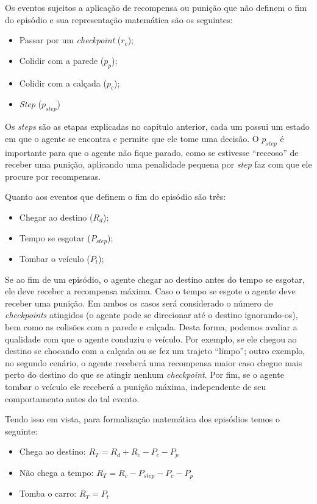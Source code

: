 Os eventos sujeitos a aplicação de recompensa ou punição que não definem o fim do episódio e sua representação matemática são os seguintes:

\begin{itemize}
   \item Passar por um \textit{checkpoint} ($r_c$);
   \item Colidir com a parede ($p_p$);
   \item Colidir com a calçada ($p_c$);
   \item \textit{Step} ($p_{step}$)
\end{itemize}

Os \textit{steps} são as etapas explicadas no capítulo anterior, cada um possui um estado em que o agente se encontra e permite que ele tome uma decisão. O $p_{step}$ é importante para que o agente não fique parado, como se estivesse ``receoso'' de receber uma punição, aplicando uma penalidade pequena por \textit{step} faz com que ele procure por recompensas. 

Quanto aos eventos que definem o fim do episódio são três:
\begin{itemize}
   \item Chegar ao destino ($R_d$);
   \item Tempo se esgotar ($P_{step}$);
   \item Tombar o veículo ($P_t$);
\end{itemize}

Se ao fim de um episódio, o agente chegar ao destino antes do tempo se esgotar, ele deve receber a recompensa máxima. Caso o tempo se esgote o agente deve receber uma punição. Em ambos os casos será considerado o número de \textit{checkpoints} atingidos (o agente pode se direcionar até o destino ignorando-os), bem como as colisões com a parede e calçada. Desta forma, podemos avaliar a qualidade com que o agente conduziu o veículo. Por exemplo, se ele chegou ao destino se chocando com a calçada ou se fez um trajeto ``limpo''; outro exemplo, no segundo cenário, o agente receberá uma recompensa maior caso chegue mais perto do destino do que se atingir nenhum \textit{checkpoint}. Por fim, se o agente tombar o veículo ele receberá a punição máxima, independente de seu comportamento antes do tal evento.

Tendo isso em vista, para formalização matemática dos episódios temos o seguinte:

\begin{itemize}
   \item Chega ao destino: $R_T = R_d + R_c - P_c - P_p$
   \item Não chega a tempo: $R_T = R_c - P_{step} - P_c - P_p$
   \item Tomba o carro: $R_T = P_t$
\end{itemize}

